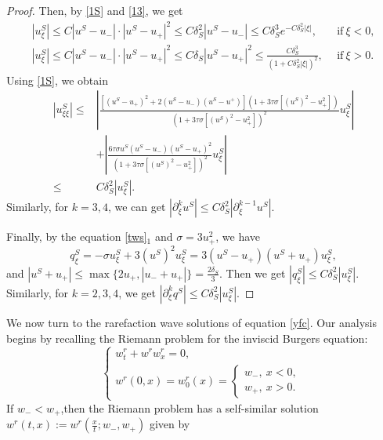 \documentclass[10pt,reqno]{amsart}
\numberwithin{equation}{section}
\begin{document}
\begin{proof}
		Then, by \eqref{1S} and \eqref{13}, we get
		\begin{align*}
		\left|u^S_{\xi}\right|\leq C|u^S-u_{-}|\cdot|u^S-u_{+}|^2\leq C\delta_{S}^2|u^S-u_{-}|\leq C\delta_S^3 e^{-C \delta_S^2|\xi|},\ \ &\text{if}\  \xi<0,\\
		\left|u^S_{\xi}\right|\leq C|u^S-u_{-}|\cdot|u^S-u_{+}|^2\leq C\delta_{S}|u^S-u_{+}|^2\leq\frac{C \delta_S^3}{\left(1+C \delta_S^2|\xi|\right)^2},\ \ &\text{if}\ \xi>0.
		\end{align*}
		Using \eqref{1S}, we obtain
		\begin{align*}
		\left|u^S_{\xi\xi}\right|\leq&\left|\frac{\left[(u^S-u_{+})^2+2(u^S-u_{-})(u^S-u^{+})\right]\left(1+3\tau\sigma\left[(u^S)^2-u_{+}^2\right]\right)}{\left(1+3\tau\sigma\left[(u^S)^2-u_{+}^2\right]\right)^2}u^S_{\xi}\right|\\
		&+\left|\frac{6\tau\sigma u^S(u^S-u_{-})(u^S-u_{+})^2}{\left(1+3\tau\sigma\left[(u^S)^2-u_{+}^2\right]\right)^2}u^S_{\xi}\right|\\
		\leq&C\delta_{S}^2\left|u^S_{\xi}\right|.
		\end{align*}
		Similarly, for $k=3,4$, we can get $\left|\partial_{\xi}^{k}u^S\right| \leq C \delta_S^2\left|\partial_{\xi}^{k-1}u^S\right|.$\par
		Finally, by the equation \eqref{tws}$_1$ and $\sigma=3u_{+}^2$, we have $$q^S_{\xi}=-\sigma u^S_{\xi}+3(u^S)^2u^S_{\xi}=3(u^S-u_{+})(u^S+u_{+})u^S_{\xi},$$
		and $|u^S+u_{+}|\leq \max\{2u_{+},\left|u_{-}+u_{+}\right|\}=\frac{2\delta_{S}}{3}$.
		Then we get $\left|q^S_{\xi}\right|\leq C\delta_{S}^2\left|u^S_{\xi}\right|$.
		Similarly, for $k=2,3,4$, we get $\left|\partial_{\xi}^{k}q^{S}\right|\leq C\delta_{S}^2\left|u^{S}_{\xi}\right|$.
	\end{proof}
	We now turn to the rarefaction wave solutions of equation \eqref{yfc}. Our analysis begins by recalling the Riemann problem for the inviscid Burgers equation:
	\begin{equation}\label{IBE}
		\begin{cases}
			w_t^r+w^r w_x^r=0, \\
			w^r(0, x)=w_0^r(x)=\begin{cases}
				w_{-},\ x<0, \\
				w_{+},\ x>0.
			\end{cases}
		\end{cases}
	\end{equation}
	If $w_{-}<w_{+}$,then the Riemann problem  has a self-similar solution $w^{r}(t,x):= w^{r}(\frac{x}{t};w_{-},w_+)$ given by
\end{document}
